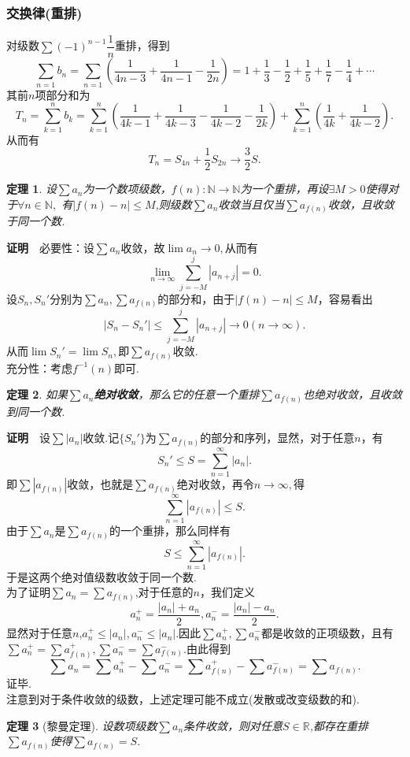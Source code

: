 \documentclass[UTF8]{article}
\newcommand{\zm}{\textbf{证明}$\quad$}
\newtheorem{thm}{\hspace{2em}定理}[section]
\begin{document}
\subsubsection{交换律(重排)}
对级数$\sum(-1)^{n-1}\dfrac{1}{n}$重排，得到
$$\sum_{n=1} b_n=\sum_{n=1}\left(\frac{1}{4n-3}+\frac{1}{4n-1}-\frac{1}{2n}\right)=
1+\frac{1}{3}-\frac{1}{2}+\frac{1}{5}+\frac{1}{7}-\frac{1}{4}+\cdots$$
其前$n$项部分和为
$$T_n=\sum_{k=1}^nb_k=\sum_{k=1}^n\left(\frac{1}{4k-1}+\frac{1}{4k-3}-\frac{1}{4k-2}-\frac{1}{2k}\right)
+\sum_{k=1}^n\left(\frac{1}{4k}+\frac{1}{4k-2}\right).$$
从而有
$$T_n=S_{4n}+\frac{1}{2}S_{2n}\to\frac{3}{2}S.$$
\begin{thm}
  设$\sum a_n$为一个数项级数，$f(n):\mathbb{N}\to\mathbb{N}$为一个重排，再设$\exists M>0$使得对于$\forall n\in\mathbb{N},$
  有$|f(n)-n|\le M$,则级数$\sum a_n$收敛当且仅当$\sum a_{f(n)}$收敛，且收敛于同一个数.
\end{thm}
\zm 必要性：设$\sum a_n$收敛，故$\lim a_n\to0,$从而有
$$\lim_{n\to\infty}\sum_{j=-M}^j|a_{n+j}|=0.$$
设$S_n,S_n'$分别为$\sum a_n,\sum a_{f(n)}$的部分和，由于$|f(n)-n|\le M$，容易看出
$$|S_n-S_n'|\le\sum_{j=-M}^j|a_{n+j}|\to0(n\to\infty).$$
从而$\lim S_n'=\lim S_n,$即$\sum a_{f(n)}$收敛.\\
充分性：考虑$f^{-1}(n)$即可.
\begin{thm}
  如果$\sum a_n$\textbf{绝对收敛}，那么它的任意一个重排$\sum a_{f(n)}$也绝对收敛，且收敛到同一个数.
\end{thm}
\zm 设$\sum|a_n|$收敛.记$\{S_n'\}$为$\sum a_{f(n)}$的部分和序列，显然，对于任意$n$，有
$$S_n'\le S=\sum_{n=1}^\infty|a_n|.$$
即$\sum|a_{f(n)}|$收敛，也就是$\sum a_{f(n)}$绝对收敛，再令$n\to\infty,$得
$$\sum_{n=1}^\infty|a_{f(n)}|\le S.$$
由于$\sum a_n$是$\sum a_{f(n)}$的一个重排，那么同样有
$$S\le\sum_{n=1}^\infty|a_{f(n)}|.$$
于是这两个绝对值级数收敛于同一个数.\\
为了证明$\sum a_n=\sum a_{f(n)}$,对于任意的$n$，我们定义
\[
a_n^+=\frac{|a_n|+a_n}{2},a_n^-=\frac{|a_n|-a_n}{2}.
\]
显然对于任意$n$,$a_n^+\le|a_n|,a_n^-\le|a_n|.$因此$\sum a_n^+,\sum a_n^-$都是收敛的正项级数，且有
$\sum a_n^+=\sum a_{f(n)}^+,\sum a_n^-=\sum a_{f(n)}^-$.由此得到
$$\sum a_n=\sum a_n^+-\sum a_n^-=\sum a_{f(n)}^+-\sum a_{f(n)}^-=\sum a_{f(n)}.$$
证毕.\\
注意到对于条件收敛的级数，上述定理可能不成立(发散或改变级数的和).\\
\begin{thm}[黎曼定理]
  设数项级数$\sum a_n$条件收敛，则对任意$S\in\mathbb{R}$,都存在重排$\sum a_{f(n)}$使得$\sum a_{f(n)}=S.$
\end{thm}
\clearpage
\end{document}
